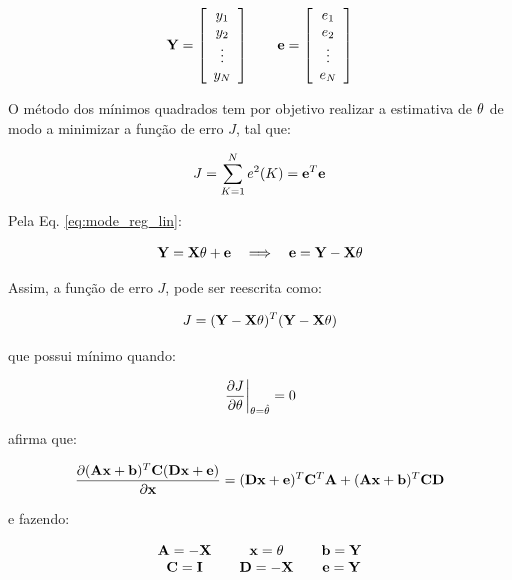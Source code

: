 \begin{equation*}
\mathbf{Y} = \left[
\begin{array}{c}
y_1\\
y_2\\
\vdots\\
y_N
\end{array}
\right] \qquad
\mathbf{e} = \left[
\begin{array}{c}
e_1\\
e_2\\
\vdots\\
e_N
\end{array}
\right]
\end{equation*}

O método dos mínimos quadrados tem por objetivo realizar a estimativa de
$\mathbf{\theta}$ de modo a minimizar a função de erro $J$, tal que:

\begin{equation}
J = \sum_{K = 1}^N e^2(K) = \mathbf{e}^T\mathbf{e}
\end{equation}

Pela Eq. \ref{eq:mode_reg_lin}:

\begin{equation}
\mathbf{Y} = \mathbf{X\theta} + \mathbf{e} \quad\Longrightarrow\quad \mathbf{e} = \mathbf{Y} - \mathbf{X\theta}
\end{equation}

Assim, a função de erro $J$, pode ser reescrita como:

\begin{equation}\label{eq:J}
J = (\mathbf{Y} - \mathbf{X\theta})^T(\mathbf{Y} - \mathbf{X\theta})
\end{equation}

\noindent que possui mínimo quando:

\begin{equation*}
\left.\frac{\partial J}{\partial \theta}\right|_{\theta = \hat{\mathbf{\theta}}} = 0
\end{equation*}

 afirma que:

\begin{equation*}
\frac{\partial (\mathbf{Ax} + \mathbf{b})^T\mathbf{C}(\mathbf{Dx} + \mathbf{e})}{\partial \mathbf{x}} =
(\mathbf{Dx} + \mathbf{e})^T\mathbf{C}^T\mathbf{A} + (\mathbf{Ax} + \mathbf{b})^T\mathbf{CD}
\end{equation*}

\noindent e fazendo:

\begin{equation*}
\begin{array}{c@{\qquad}c@{\qquad}c}
\mb{A} = -\mb{X} & \mb{x} = \mb{\theta} & \mb{b} = \mb{Y}\\
\mb{C} = \mb{I}  & \mb{D} = -\mb{X}     & \mb{e} = \mb{Y}
\end{array}
\end{equation*}

